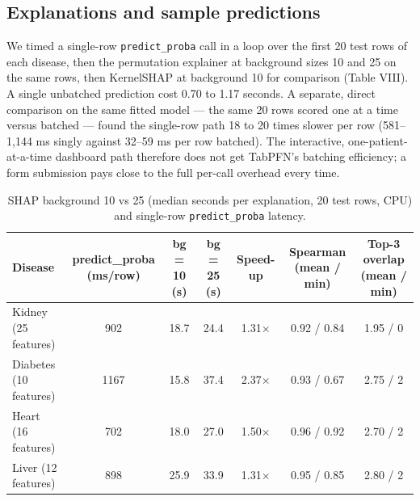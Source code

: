 \documentclass[conference]{IEEEtran}
\begin{document}
\subsection{Explanations and sample predictions}

We timed a single-row \texttt{predict\_proba} call in a loop over the first 20 test rows of each disease, then the permutation explainer at background sizes 10 and 25 on the same rows, then KernelSHAP at background 10 for comparison (Table VIII). A single unbatched prediction cost 0.70 to 1.17 seconds. A separate, direct comparison on the same fitted model --- the same 20 rows scored one at a time versus batched --- found the single-row path 18 to 20 times slower per row (581--1,144 ms singly against 32--59 ms per row batched). The interactive, one-patient-at-a-time dashboard path therefore does not get TabPFN's batching efficiency; a form submission pays close to the full per-call overhead every time.

\begin{table}[!t]
\caption{SHAP background 10 vs 25 (median seconds per explanation, 20 test rows, CPU) and single-row \texttt{predict\_proba} latency.}
\label{tab:shap}
\centering\footnotesize
\begin{tabularx}{\textwidth}{>{\raggedright\arraybackslash}Xcccccc}
\toprule
\textbf{Disease} & \textbf{predict\_proba (ms/row)} & \textbf{bg = 10 (s)} & \textbf{bg = 25 (s)} & \textbf{Speed-up} & \textbf{Spearman (mean / min)} & \textbf{Top-3 overlap (mean / min)} \\
\midrule
Kidney (25 features) & 902 & 18.7 & 24.4 & 1.31$\times$ & 0.92 / 0.84 & 1.95 / 0 \\
Diabetes (10 features) & 1167 & 15.8 & 37.4 & 2.37$\times$ & 0.93 / 0.67 & 2.75 / 2 \\
Heart (16 features) & 702 & 18.0 & 27.0 & 1.50$\times$ & 0.96 / 0.92 & 2.70 / 2 \\
Liver (12 features) & 898 & 25.9 & 33.9 & 1.31$\times$ & 0.95 / 0.85 & 2.80 / 2 \\
\bottomrule
\end{tabularx}
\end{table}
\end{document}
